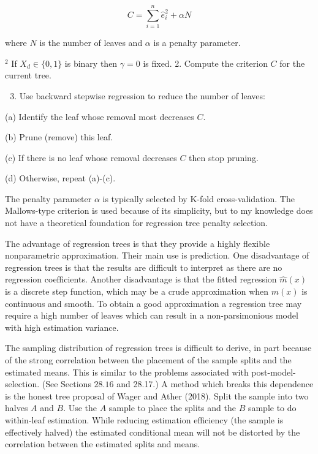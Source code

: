 \documentclass[10pt]{article}
\begin{document}
$$
C=\sum_{i=1}^{n} \widehat{e}_{i}^{2}+\alpha N
$$

where $N$ is the number of leaves and $\alpha$ is a penalty parameter.

${ }^{2}$ If $X_{d} \in\{0,1\}$ is binary then $\gamma=0$ is fixed. 2. Compute the criterion $C$ for the current tree.

\begin{enumerate}
  \setcounter{enumi}{2}
  \item Use backward stepwise regression to reduce the number of leaves:
\end{enumerate}

(a) Identify the leaf whose removal most decreases $C$.

(b) Prune (remove) this leaf.

(c) If there is no leaf whose removal decreases $C$ then stop pruning.

(d) Otherwise, repeat (a)-(c).

The penalty parameter $\alpha$ is typically selected by K-fold cross-validation. The Mallows-type criterion is used because of its simplicity, but to my knowledge does not have a theoretical foundation for regression tree penalty selection.

The advantage of regression trees is that they provide a highly flexible nonparametric approximation. Their main use is prediction. One disadvantage of regression trees is that the results are difficult to interpret as there are no regression coefficients. Another disadvantage is that the fitted regression $\widehat{m}(x)$ is a discrete step function, which may be a crude approximation when $m(x)$ is continuous and smooth. To obtain a good approximation a regression tree may require a high number of leaves which can result in a non-parsimonious model with high estimation variance.

The sampling distribution of regression trees is difficult to derive, in part because of the strong correlation between the placement of the sample splits and the estimated means. This is similar to the problems associated with post-model-selection. (See Sections $28.16$ and 28.17.) A method which breaks this dependence is the honest tree proposal of Wager and Ather (2018). Split the sample into two halves $A$ and $B$. Use the $A$ sample to place the splits and the $B$ sample to do within-leaf estimation. While reducing estimation efficiency (the sample is effectively halved) the estimated conditional mean will not be distorted by the correlation between the estimated splits and means.
\end{document}
